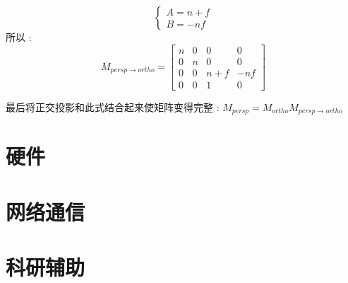 \documentclass[UTF8,12pt]{ctexbook}
\begin{document}
{{{{\begin{itemize}
{\begin{itemize}
{$$\begin{cases}
                            A = n + f \\
                            B = -nf
                          \end{cases}
                        $$
                        所以 : $$
                          M_{persp \to ortho}
                          =
                          \begin{bmatrix}
                            n & 0 & 0     & 0   \\
                            0 & n & 0     & 0   \\
                            0 & 0 & n + f & -nf \\
                            0 & 0 & 1     & 0
                          \end{bmatrix}
                        $$

                        最后将正交投影和此式结合起来使矩阵变得完整 : $M_{persp} = M_{ortho}M_{persp \to ortho}$
                        }
                \end{itemize}
                }
        \end{itemize}


      }%

    }%

   }%

  \section{硬件}{

   }%

  \section{网络通信}{

   }%

  \section{科研辅助}{

   }%

 }%
\end{document}
